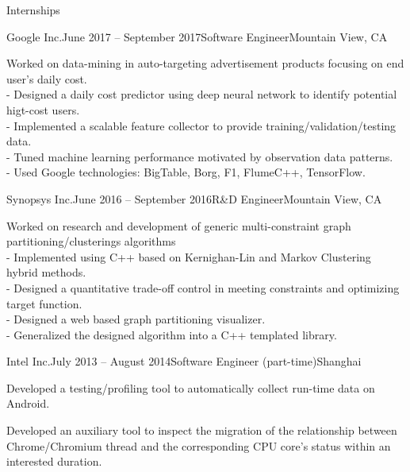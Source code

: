 \documentclass{resume} %
\begin{document}

\begin{rSection}{Internships}

    \begin{rSubsection}{Google Inc.}{June 2017 -- September 2017}{Software Engineer}{Mountain View, CA}

    \item Worked on data-mining in auto-targeting advertisement products focusing on end user's daily cost.
     \\- Designed a daily cost predictor using deep neural network to identify potential higt-cost users.
     \\- Implemented a scalable feature collector to provide training/validation/testing data.
     \\- Tuned machine learning performance motivated by observation data patterns.
     \\- Used Google technologies: BigTable, Borg, F1, FlumeC++, TensorFlow.
    \end{rSubsection}

    \begin{rSubsection}{Synopsys Inc.}{June 2016 -- September 2016}{R\&D Engineer}{Mountain View, CA}

    \item Worked on research and development of generic multi-constraint graph partitioning/clusterings algorithms
     \\- Implemented using C++ based on Kernighan-Lin and Markov Clustering hybrid methods.
     \\- Designed a quantitative trade-off control in meeting constraints and optimizing target function.
     \\- Designed a web based graph partitioning visualizer.
     \\- Generalized the designed algorithm into a C++ templated library.
    \end{rSubsection}

    \begin{rSubsection}{Intel Inc.}{July 2013 -- August 2014}{Software Engineer (part-time)}{Shanghai}

    \item Developed a testing/profiling tool to automatically collect run-time data on Android.
    \item Developed an auxiliary tool to inspect the migration of the
        relationship between Chrome/Chromium thread and the corresponding CPU
        core's status within an interested duration.


\end{rSubsection}
\end{rSection}
\end{document}
